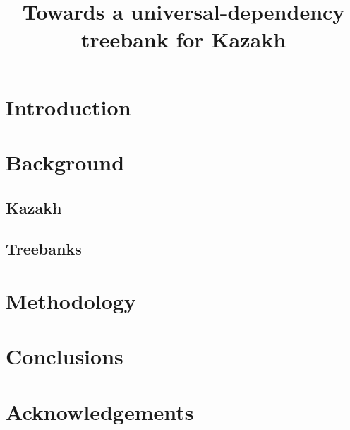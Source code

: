 \documentclass[a4paper,11pt,twocolumn]{article}
\title{Towards a universal-dependency treebank for Kazakh}
\begin{document}
\maketitleabstract{}


\section{Introduction}

\section{Background}

\subsection{Kazakh}

\subsection{Treebanks} %

\section{Methodology}

\section{Conclusions}

\section*{Acknowledgements}
\end{document}
